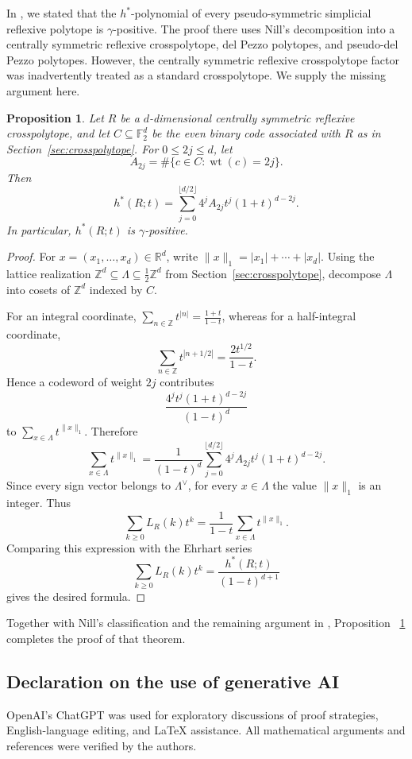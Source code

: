 \documentclass[12pt]{amsart}
\newtheorem{Proposition}[Theorem]{Proposition}
\theoremstyle{definition}
\newcommand{\ZZ}{\mathbb Z}
\newcommand{\RR}{\mathbb R}
\begin{document}
In \cite[Theorem~5.8]{OhsugiTsuchiyaLocally}, we stated that the
$h^*$-polynomial of every pseudo-symmetric simplicial reflexive polytope
is $\gamma$-positive.
The proof there uses Nill's decomposition into a centrally symmetric
reflexive crosspolytope, del Pezzo polytopes, and pseudo-del Pezzo
polytopes.
However, the centrally symmetric reflexive crosspolytope factor was
inadvertently treated as a standard crosspolytope.
We supply the missing argument here.

\begin{Proposition}\label{prop:crosspolytope-gamma}
Let $R$ be a $d$-dimensional centrally symmetric reflexive
crosspolytope, and let $C\subseteq\mathbb F_2^d$ be the even binary
code associated with $R$ as in Section~\ref{sec:crosspolytope}.
For $0\le2j\le d$, let
\[
A_{2j}
=
\#\{c\in C:\operatorname{wt}(c)=2j\}.
\]
Then
\[
h^*(R;t)
=
\sum_{j=0}^{\lfloor d/2\rfloor}
4^jA_{2j}t^j(1+t)^{d-2j}.
\]
In particular, $h^*(R;t)$ is $\gamma$-positive.
\end{Proposition}
\begin{proof}
For $x=(x_1,\ldots,x_d)\in\RR^d$, write
$\|x\|_1=|x_1|+\cdots+|x_d|$.
Using the lattice realization
$\ZZ^d\subseteq\Lambda\subseteq\frac12\ZZ^d$
from Section~\ref{sec:crosspolytope}, decompose $\Lambda$ into cosets
of $\ZZ^d$ indexed by $C$.

For an integral coordinate,
$\sum_{n\in\ZZ}t^{|n|}
=
\frac{1+t}{1-t}$,
whereas for a half-integral coordinate,
\[
\sum_{n\in\ZZ}t^{|n+1/2|}
=
\frac{2t^{1/2}}{1-t}.
\]
Hence a codeword of weight $2j$ contributes
\[
\frac{4^jt^j(1+t)^{d-2j}}{(1-t)^d}
\]
to
$\sum_{x\in\Lambda}t^{\|x\|_1}$.
Therefore
\[
\sum_{x\in\Lambda}t^{\|x\|_1}
=
\frac{1}{(1-t)^d}
\sum_{j=0}^{\lfloor d/2\rfloor}
4^jA_{2j}t^j(1+t)^{d-2j}.
\]
Since every sign vector belongs to $\Lambda^\vee$, for every
$x\in\Lambda$ the value $\|x\|_1$ is an integer.
Thus
\[
\sum_{k\ge0}L_R(k)t^k
=
\frac{1}{1-t}
\sum_{x\in\Lambda}t^{\|x\|_1}.
\]
Comparing this expression with the Ehrhart series
\[
\sum_{k\ge0}L_R(k)t^k
=
\frac{h^*(R;t)}{(1-t)^{d+1}}
\]
gives the desired formula.
\end{proof}

Together with Nill's classification and the remaining argument in
\cite[Theorem~5.8]{OhsugiTsuchiyaLocally}, Proposition~
\ref{prop:crosspolytope-gamma} completes the proof of that theorem.

\subsection*{Declaration on the use of generative AI}
OpenAI's ChatGPT was used for exploratory discussions of proof
strategies, English-language editing, and \LaTeX{} assistance.
All mathematical arguments and references were verified by the authors.




\end{document}
